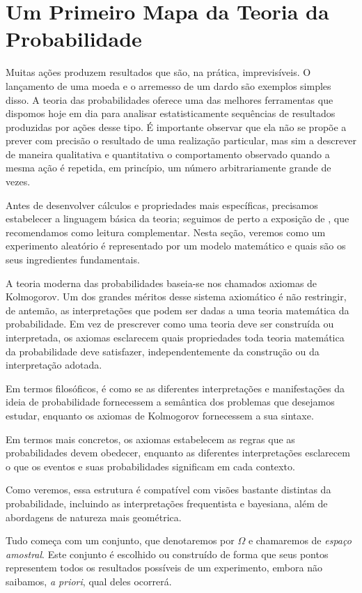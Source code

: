 \documentclass[12pt,portuguese]{article}
\theoremstyle{definition}
\begin{document}
\section{Um Primeiro Mapa da Teoria da Probabilidade}

Muitas ações produzem resultados que são, na prática, imprevisíveis. O
lançamento de uma moeda e o arremesso de um dardo são exemplos simples disso.
A teoria das probabilidades oferece uma das melhores ferramentas que dispomos
hoje em dia para analisar
estatisticamente sequências de resultados produzidas por ações desse tipo.
É importante observar que ela não se propõe a prever com precisão o resultado de uma
realização particular, mas sim a descrever de maneira qualitativa e quantitativa o comportamento observado quando a
mesma ação é repetida, em princípio, um número arbitrariamente grande de vezes.

Antes de desenvolver cálculos e propriedades mais específicas, precisamos
estabelecer a linguagem básica da teoria; seguimos de perto a exposição de
\cite{GrimmettWelsh2014}, que recomendamos como leitura complementar. Nesta seção, veremos como um
experimento aleatório é representado por um modelo matemático e quais são os
seus ingredientes fundamentais.

A teoria moderna das probabilidades baseia-se nos chamados axiomas de
Kolmogorov. Um dos grandes méritos desse sistema axiomático é não restringir,
de antemão, as interpretações que podem ser dadas a uma teoria matemática da
probabilidade. Em vez de prescrever como uma teoria deve ser construída ou
interpretada, os axiomas esclarecem quais propriedades toda teoria matemática
da probabilidade deve satisfazer, independentemente da construção ou da
interpretação adotada.

Em termos filosóficos, é como se as diferentes interpretações e manifestações
da ideia de probabilidade fornecessem a semântica dos problemas que desejamos
estudar, enquanto os axiomas de Kolmogorov fornecessem a sua sintaxe.

Em termos mais concretos, os axiomas estabelecem as regras que as
probabilidades devem obedecer, enquanto as diferentes interpretações
esclarecem o que os eventos e suas probabilidades significam em cada contexto.

Como veremos, essa estrutura é compatível com visões bastante distintas da
probabilidade, incluindo as interpretações frequentista e bayesiana, além de
abordagens de natureza mais geométrica.


Tudo começa com um conjunto, que denotaremos por $\Omega$ e chamaremos de
\emph{espaço amostral}. Este conjunto é escolhido ou construído de forma que 
seus pontos representem todos os resultados possíveis
de um experimento, embora não saibamos, \emph{a priori}, qual deles ocorrerá.
\end{document}
